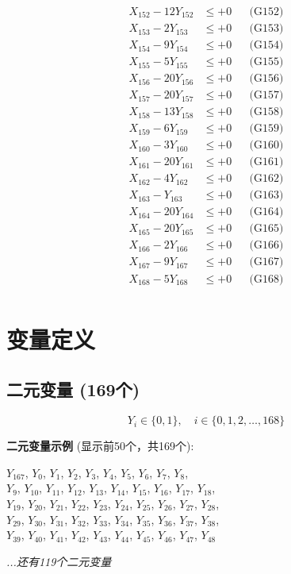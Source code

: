 \documentclass[a4paper,10pt]{article}
\begin{document}
{\begin{align}
\allowbreak
X_{152} - 12Y_{152} &\leq +0 && \text{(G152)} \\
X_{153} - 2Y_{153} &\leq +0 && \text{(G153)} \\
X_{154} - 9Y_{154} &\leq +0 && \text{(G154)} \\
X_{155} - 5Y_{155} &\leq +0 && \text{(G155)} \\
X_{156} - 20Y_{156} &\leq +0 && \text{(G156)} \\
X_{157} - 20Y_{157} &\leq +0 && \text{(G157)} \\
X_{158} - 13Y_{158} &\leq +0 && \text{(G158)} \\
X_{159} - 6Y_{159} &\leq +0 && \text{(G159)} \\
X_{160} - 3Y_{160} &\leq +0 && \text{(G160)} \\
X_{161} - 20Y_{161} &\leq +0 && \text{(G161)} \\
\allowbreak
X_{162} - 4Y_{162} &\leq +0 && \text{(G162)} \\
X_{163} - Y_{163} &\leq +0 && \text{(G163)} \\
X_{164} - 20Y_{164} &\leq +0 && \text{(G164)} \\
X_{165} - 20Y_{165} &\leq +0 && \text{(G165)} \\
X_{166} - 2Y_{166} &\leq +0 && \text{(G166)} \\
X_{167} - 9Y_{167} &\leq +0 && \text{(G167)} \\
X_{168} - 5Y_{168} &\leq +0 && \text{(G168)} \\
\end{align}
}

\section{变量定义}

\subsection{二元变量 (169个)}

\begin{equation}
Y_i \in \{0,1\}, \quad i \in \{0, 1, 2, \ldots, 168\}
\end{equation}

\textbf{二元变量示例} (显示前50个，共169个):

{\small
$Y_{167}$, $Y_{0}$, $Y_{1}$, $Y_{2}$, $Y_{3}$, $Y_{4}$, $Y_{5}$, $Y_{6}$, $Y_{7}$, $Y_{8}$, \\
$Y_{9}$, $Y_{10}$, $Y_{11}$, $Y_{12}$, $Y_{13}$, $Y_{14}$, $Y_{15}$, $Y_{16}$, $Y_{17}$, $Y_{18}$, \\
$Y_{19}$, $Y_{20}$, $Y_{21}$, $Y_{22}$, $Y_{23}$, $Y_{24}$, $Y_{25}$, $Y_{26}$, $Y_{27}$, $Y_{28}$, \\
$Y_{29}$, $Y_{30}$, $Y_{31}$, $Y_{32}$, $Y_{33}$, $Y_{34}$, $Y_{35}$, $Y_{36}$, $Y_{37}$, $Y_{38}$, \\
$Y_{39}$, $Y_{40}$, $Y_{41}$, $Y_{42}$, $Y_{43}$, $Y_{44}$, $Y_{45}$, $Y_{46}$, $Y_{47}$, $Y_{48}$

\textit{...还有119个二元变量}
}
\end{document}
